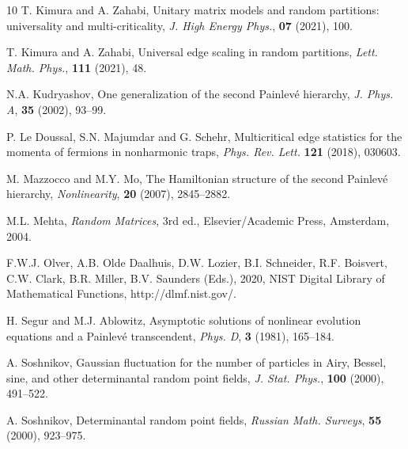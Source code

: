 \documentclass[11pt,a4paper]{article}
\numberwithin{equation}{section}
\begin{document}
\begin{thebibliography}{10}
T. Kimura and A. Zahabi, Unitary matrix models and random partitions: universality and multi-criticality, {\it J. High Energy Phys.}, {\bf 07} (2021), 100.

T. Kimura and A. Zahabi, Universal edge scaling in random partitions, {\it Lett. Math. Phys.},  {\bf 111} (2021), 48.


N.A. Kudryashov, One generalization of the second Painlev\'{e} hierarchy, {\it J. Phys. A}, {\bf 35} (2002),
93--99.

P. Le Doussal, S.N. Majumdar and G. Schehr, Multicritical edge statistics for the momenta of fermions in nonharmonic traps, {\it Phys. Rev. Lett.} {\bf 121} (2018), 030603.


M. Mazzocco and M.Y. Mo, The Hamiltonian structure of the second Painlev\'{e} hierarchy, {\it Nonlinearity},
{\bf 20} (2007), 2845--2882.

M.L. Mehta, {\it Random Matrices}, 3rd ed., Elsevier/Academic Press, Amsterdam, 2004.






F.W.J. Olver, A.B.  Olde Daalhuis,    D.W. Lozier, B.I. Schneider, R.F. Boisvert, C.W. Clark, B.R. Miller, B.V. Saunders (Eds.), 2020, NIST Digital Library of Mathematical Functions,  http://dlmf.nist.gov/.




H. Segur and M.J. Ablowitz, Asymptotic solutions of nonlinear evolution equations and a
Painlev\'{e} transcendent, {\it Phys. D}, {\bf 3} (1981), 165--184.

A. Soshnikov, Gaussian fluctuation for the number of particles in Airy, Bessel, sine, and other determinantal random point fields,
{\it J. Stat. Phys.}, {\bf 100} (2000), 491--522.


A. Soshnikov, Determinantal random point fields, {\it Russian Math. Surveys}, {\bf 55} (2000), 923--975.



\end{thebibliography}
\end{document}
